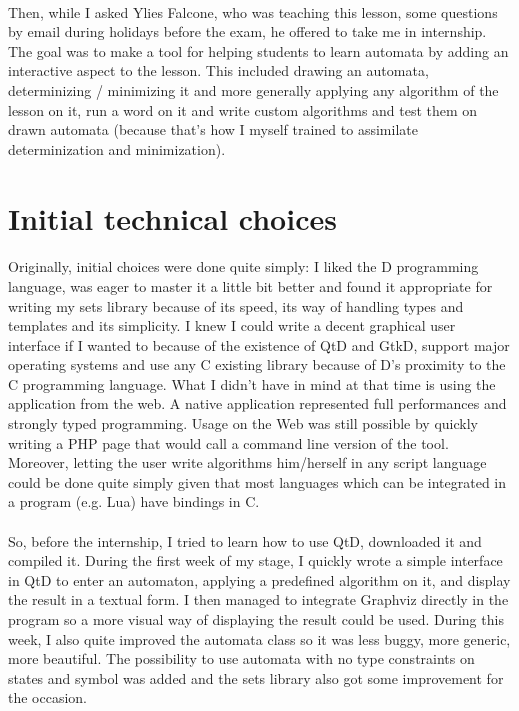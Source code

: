 \documentclass{article}
\begin{document}
\begin{sloppypar}
\paragraph{}
Then, while I asked Ylies Falcone, who was teaching this lesson, some questions by email during holidays before the exam, he offered to take me in internship. The goal was to make a tool for helping students to learn automata by adding an interactive aspect to the lesson. This included drawing an automata, determinizing / minimizing it and more generally applying any algorithm of the lesson on it, run a word on it and write custom algorithms and test them on drawn automata (because that's how I myself trained to assimilate determinization and minimization).




\section{ Initial technical choices}


\paragraph{}
Originally, initial choices were done quite simply: I liked the D programming language, was eager to master it a little bit better and found it appropriate for writing my sets library because of its speed, its way of handling types and templates and its simplicity. I knew I could write a decent graphical user interface if I wanted to because of the existence of QtD and GtkD, support major operating systems and use any C existing library because of D's proximity to the C programming language. What I didn't have in mind at that time is using the application from the web. A native application represented full performances and strongly typed programming. Usage on the Web was still possible by quickly writing a PHP page that would call a command line version of the tool. Moreover, letting the user write algorithms him/herself in any script language could be done quite simply given that most languages which can be integrated in a program (e.g. Lua) have bindings in C.

   
\paragraph{}
So, before the internship, I tried to learn how to use QtD, downloaded it and compiled it. During the first week of my stage, I quickly wrote a simple interface in QtD to enter an automaton, applying a predefined algorithm on it, and display the result in a textual form. I then managed to integrate Graphviz directly in the program so a more visual way of displaying the result could be used. During this week, I also quite improved the automata class so it was less buggy, more generic, more beautiful. The possibility to use automata with no type constraints on states and symbol was added and the sets library also got some improvement for the occasion.


\end{sloppypar}
\end{document}
